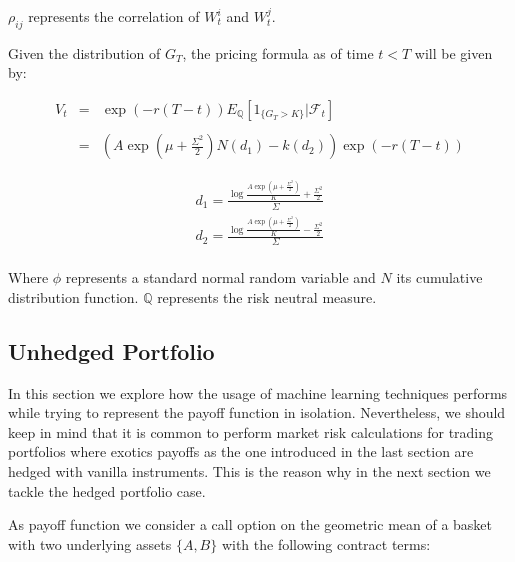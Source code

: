 $\rho_{ij}$ represents the correlation of $W_t^i$ and $W_t^j$.

Given the distribution of $G_T$, the pricing formula as of time $t<T$ will be given by:

$$
\begin{array}{lll}
V_{t}&=&\exp (-r(T-t)) E_{\mathbb{Q}}\left[1_{\{G_{T}>K\}} | \mathcal{F}_t\right] \\
&& \\
&=&\left(A\exp\left(\mu+\frac{\Sigma^2}{2}\right)N\left(d_1\right)-k\left(d_2\right)\right)\exp\left(-r(T-t)\right)
\end{array}
$$

$$
\begin{aligned}
d_1 = \frac{\log\frac{A\exp\left(\mu+\frac{\Sigma^2}{2}\right)}{K}+\frac{\Sigma^2}{2}}{\Sigma} \\
d_2 = \frac{\log\frac{A\exp\left(\mu+\frac{\Sigma^2}{2}\right)}{K}-\frac{\Sigma^2}{2}}{\Sigma} \\
\end{aligned}
$$



Where $\phi$ represents a standard normal random variable and $N$ its cumulative distribution function. $\mathbb{Q}$ represents the risk neutral measure.


\subsection{Unhedged Portfolio}
 In this section we explore how the usage of machine learning techniques performs while trying to represent the payoff function in isolation. Nevertheless, we should keep in mind that it is common to perform market risk calculations for trading portfolios where exotics payoffs as the one introduced in the last section are hedged with vanilla instruments. This is the reason why in the next section we tackle the hedged portfolio case. 
 
 As payoff function we consider a call option on the geometric mean of a basket with two underlying assets $\{A,B\}$ with the following contract terms:
 
 
